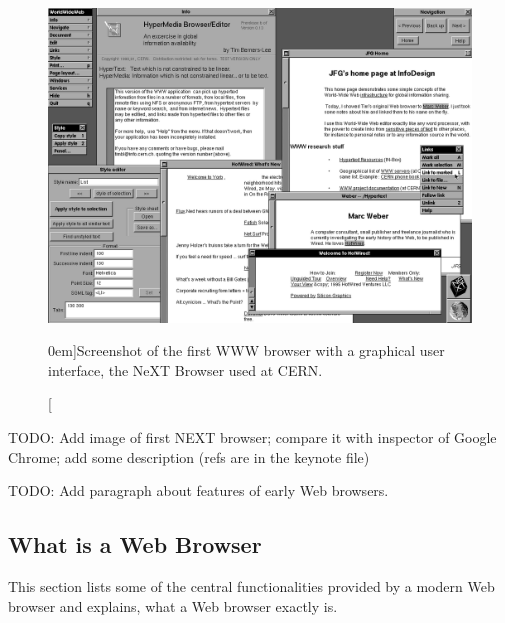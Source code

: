 \documentclass[a4paper, justified, notoc]{tufte-handout} %
\begin{document}
\begin{figure}%
	\centering
  \includegraphics[width=1.0\textwidth]{./figures/next_browser.png}
  \caption[][0em]{Screenshot of the first WWW browser with a graphical user interface, the NeXT Browser used at CERN.}
  \label{fig:next_browser}
\end{figure}

TODO: Add image of first NEXT browser; compare it with inspector of Google Chrome; add some description (refs are in the keynote file)

TODO: Add paragraph about features of early Web browsers.


\subsection{What is a Web Browser}
\label{sub:what_is_a_web_browser}


This section lists some of the central functionalities provided by a modern Web browser and explains, what a Web browser exactly is.
\end{document}
